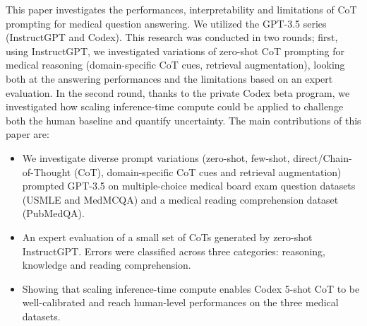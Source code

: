 \documentclass{article} \usepackage{iclr2022_conference,times}
\begin{document}
This paper investigates the performances, interpretability and limitations of CoT prompting for medical question answering. We utilized the GPT-3.5 series (InstructGPT and Codex). This research was conducted in two rounds; first, using InstructGPT, we investigated variations of zero-shot CoT prompting for medical reasoning (domain-specific CoT cues, retrieval augmentation), looking both at the answering performances and the limitations based on an expert evaluation. In the second round, thanks to the private Codex beta program, we investigated how scaling inference-time compute could be applied to challenge both the human baseline and quantify uncertainty. The main contributions of this paper are:
\begin{itemize}
    \item We investigate diverse prompt variations (zero-shot, few-shot, direct/Chain-of-Thought (CoT), domain-specific CoT cues and retrieval augmentation) prompted GPT-3.5 on multiple-choice medical board exam question datasets (USMLE and MedMCQA) and a medical reading comprehension dataset (PubMedQA).
    \item An expert evaluation of a small set of CoTs generated by zero-shot InstructGPT. Errors were classified across three categories: reasoning, knowledge and reading comprehension. \item Showing that scaling inference-time compute enables Codex 5-shot CoT to be well-calibrated and reach human-level performances on the three medical datasets.
\end{itemize}
\end{document}
